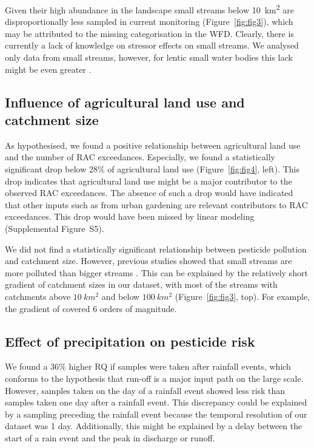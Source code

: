 \documentclass[journal=esthag,manuscript=article]{achemso}
\begin{document}
Given their high abundance in the landscape \citep{nadeau_hydrological_2007} small streams below 10~km\textsuperscript{2} are disproportionally less sampled in current monitoring (Figure~\ref{fig:fig3}), which may be attributed to the missing categorisation in the WFD. 
Clearly, there is currently a lack of knowledge on stressor effects on small streams.
We analysed only data from small streams, however, for lentic small water bodies this lack might be even greater \citep{lorenz_specifics_2016}. 


\subsection{Influence of agricultural land use and catchment size}
As hypothesised, we found a positive relationship between agricultural land use and the number of RAC exceedances.
Especially, we found a statistically significant drop below 28\% of agricultural land use (Figure~\ref{fig:fig4}, left).
This drop indicates that agricultural land use might be a major contributor to the observed RAC exceedances.
The absence of such a drop would have indicated that other inputs such as from urban gardening are relevant contributors to RAC exceedances.  
This drop would have been missed by linear modeling (Supplemental Figure~S5). 

We did not find a statistically significant relationship between pesticide pollution and catchment size. 
However, previous studies showed that small streams are more polluted than bigger streams \citep{schulz_field_2004,stehle_pesticide_2015,knauer_pesticides_2016}.
This can be explained by the relatively short gradient of catchment sizes in our dataset, with most of the streams with catchments above $10~km^2$ and below $100~km^2$ (Figure~\ref{fig:fig3}, top).
For example, the gradient of \citet{schulz_field_2004} covered 6 orders of magnitude.


\subsection{Effect of precipitation on pesticide risk}
We found a 36\% higher RQ if samples were taken after rainfall events, which conforms to the hypothesis that run-off is a major input path on the large scale.
However, samples taken on the day of a rainfall event showed less risk than samples taken one day after a rainfall event.
This discrepancy could be explained by a sampling preceding the rainfall event because the temporal resolution of our dataset was 1 day.
Additionally, this might be explained by a delay between the start of a rain event and the peak in discharge or runoff. 
\end{document}

